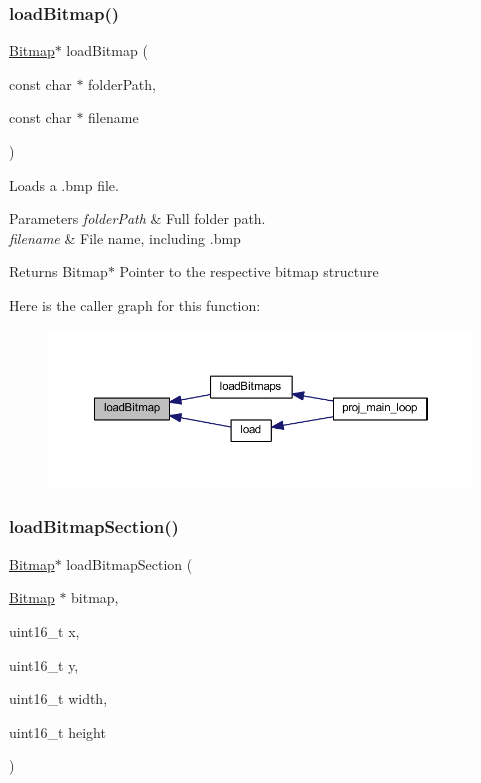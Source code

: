 \subsubsection{\texorpdfstring{load\+Bitmap()}{loadBitmap()}}
{\footnotesize\ttfamily \mbox{\hyperlink{struct_bitmap}{Bitmap}}$\ast$ load\+Bitmap (\begin{DoxyParamCaption}\item[{const char $\ast$}]{folder\+Path,  }\item[{const char $\ast$}]{filename }\end{DoxyParamCaption})}



Loads a .bmp file. 


\begin{DoxyParams}{Parameters}
{\em folder\+Path} & Full folder path. \\
\hline
{\em filename} & File name, including .bmp \\
\hline
\end{DoxyParams}
\begin{DoxyReturn}{Returns}
Bitmap$\ast$ Pointer to the respective bitmap structure 
\end{DoxyReturn}
Here is the caller graph for this function\+:\nopagebreak
\begin{figure}[H]
\begin{center}
\leavevmode
\includegraphics[width=350pt]{group__bitmap_ga627d64d58e9bf487fb6e326ea65df57b_icgraph}
\end{center}
\end{figure}
\mbox{\label{group__bitmap_ga3f8f5ad40944f2db40792d7c4fe5b96e}} 
\subsubsection{\texorpdfstring{load\+Bitmap\+Section()}{loadBitmapSection()}}
{\footnotesize\ttfamily \mbox{\hyperlink{struct_bitmap}{Bitmap}}$\ast$ load\+Bitmap\+Section (\begin{DoxyParamCaption}\item[{\mbox{\hyperlink{struct_bitmap}{Bitmap}} $\ast$}]{bitmap,  }\item[{uint16\+\_\+t}]{x,  }\item[{uint16\+\_\+t}]{y,  }\item[{uint16\+\_\+t}]{width,  }\item[{uint16\+\_\+t}]{height }\end{DoxyParamCaption})}



